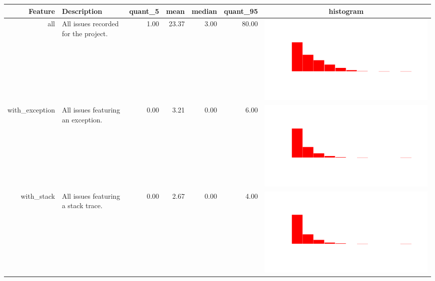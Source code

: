 \begin{table}[ht]
\centering
\begin{tabular}{rp{27em}rrrrc}
  \hline
Feature & Description & quant\_5 & mean & median & quant\_95 & histogram \\ 
  \hline
all & All issues recorded for the project. & 1.00 & 23.37 & 3.00 & 80.00 & \includegraphics[scale = 0.1, clip = true, trim= 50px 60px 50px 60px]{hist-31b77719e3773ad7ac2073785de62a5f.pdf} \\ 
  with\_exception & All issues featuring an exception. & 0.00 & 3.21 & 0.00 & 6.00 & \includegraphics[scale = 0.1, clip = true, trim= 50px 60px 50px 60px]{hist-0c1305fc40f695dbdd1f4696db24f147.pdf} \\ 
  with\_stack & All issues featuring a stack trace. & 0.00 & 2.67 & 0.00 & 4.00 & \includegraphics[scale = 0.1, clip = true, trim= 50px 60px 50px 60px]{hist-896524802e915aa3f01ef1ecd2489e7e.pdf} \\ 

\end{tabular}
\end{table}
